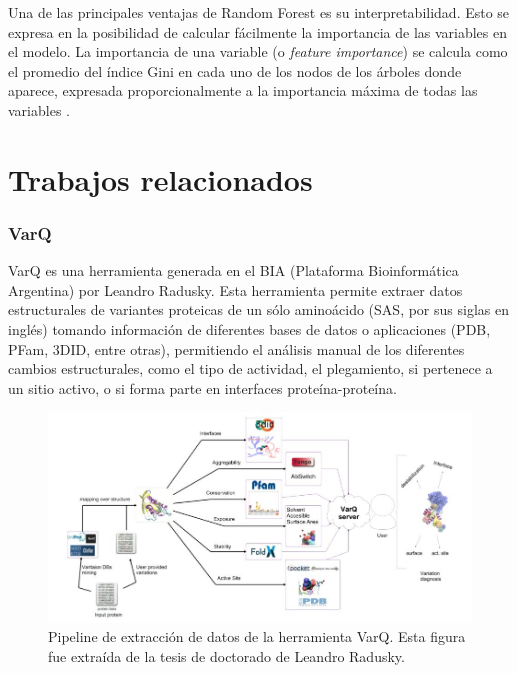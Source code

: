 Una de las principales ventajas de Random Forest es su interpretabilidad. Esto se expresa en la posibilidad de calcular fácilmente la importancia de las variables en el modelo. La importancia de una variable (o \textit{feature importance}) se calcula como el promedio del índice Gini en cada uno de los nodos de los árboles donde aparece, expresada proporcionalmente a la importancia máxima de todas las variables \cite{Hastie2001}.  




\newpage

\section{Trabajos relacionados}

\subsubsection{VarQ \cite{Radusky2017}}

VarQ es una herramienta generada en el BIA (Plataforma Bioinformática Argentina) por Leandro Radusky. Esta herramienta permite extraer datos estructurales de variantes proteicas de un sólo aminoácido (SAS, por sus siglas en inglés) tomando información de diferentes bases de datos o aplicaciones (PDB, PFam, 3DID, entre otras), permitiendo el análisis manual de los diferentes cambios estructurales, como el tipo de actividad, el plegamiento, si pertenece a un sitio activo, o si forma parte en interfaces proteína-proteína. 

\begin{figure}[H]
    \centering
    \includegraphics[scale=0.4]{documents/latex/figures/1/pipeline.png}
    \caption{Pipeline de extracción de datos de la herramienta VarQ. Esta figura fue extraída de la tesis de doctorado de Leandro Radusky.}
    \label{fig:varq_pipeline}
\end{figure}

